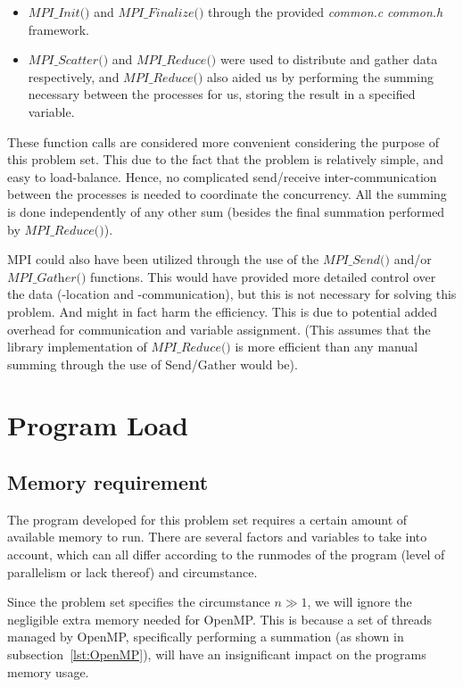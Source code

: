 \documentclass[fontsize=11pt,paper=a4,titlepage]{report}
\begin{document}
\begin{itemize}
	\item{$\textit{MPI\_Init()}$ and $\textit{
MPI\_Finalize()}$ through the provided \textit{common.c} \textit{common.h}
framework.}
	\item{$\textit{MPI\_Scatter()}$ and $\textit{MPI\_Reduce()}$ were used to
distribute 	and gather data respectively, and $\textit{MPI\_Reduce()}$ also
aided us by performing the summing necessary between the processes for us,
storing the result in a specified variable.}
\end{itemize}

These function calls are considered more convenient considering the purpose of
this problem set. This due to the fact that the problem is relatively simple,
and easy to load-balance. Hence, no complicated send/receive inter-communication
between the processes is needed to coordinate the concurrency. All the summing
is done independently of any other sum (besides the final summation performed by
$\textit{MPI\_Reduce()}$).

MPI could also have been utilized through the use of the $\textit{MPI\_Send()}$
and/or $\textit{MPI\_Gather()}$ functions. This would have provided more
detailed control over the data (-location and -communication), but this is not
necessary for solving this problem. And might in fact harm the efficiency. This
is due to potential added overhead for communication and variable assignment.
(This assumes that the library implementation of $\textit{MPI\_Reduce()}$ is
more efficient than any manual summing through the use of Send/Gather would be).


\section{Program Load}

\subsection{Memory requirement}
\label{subsec:MemReq}

The program developed for this problem set requires a certain amount of
available memory to run. There are several factors and variables to take into
account, which can all differ according to the runmodes of the program (level of
parallelism or lack thereof) and circumstance.

Since the problem set specifies the circumstance $n \gg 1$, we will ignore the
negligible extra memory needed for OpenMP. This is because a set of threads
managed by OpenMP, specifically performing a summation (as shown in
subsection~\ref{lst:OpenMP}), will have an insignificant impact on the programs
memory usage.
\end{document}
